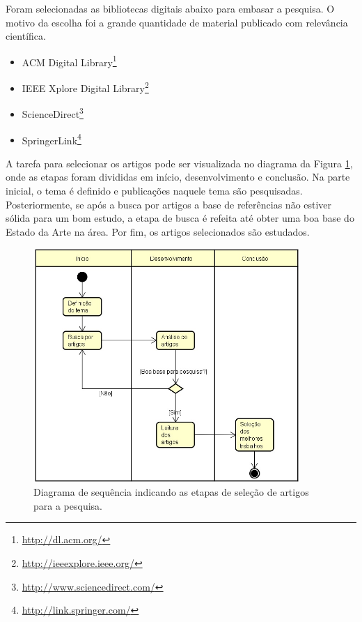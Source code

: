 \documentclass[smallextended]{svjour3}
\begin{document}
Foram selecionadas as bibliotecas digitais abaixo para embasar a pesquisa. O motivo da escolha foi a grande quantidade de material publicado com relevância científica.

\begin{itemize}
	\item \textsf{ACM Digital Library}\footnote{\url{http://dl.acm.org/}}
	
	\item \textsf{IEEE Xplore Digital Library}\footnote{\url{http://ieeexplore.ieee.org/}}
	
	\item \textsf{ScienceDirect}\footnote{\url{http://www.sciencedirect.com/}} 	
	
	\item \textsf{SpringerLink}\footnote{\url{http://link.springer.com/}}
\end{itemize}

A tarefa para selecionar os artigos pode ser visualizada no diagrama da Figura \ref{fig:diagrama}, onde as etapas foram divididas em início, desenvolvimento e conclusão. Na parte inicial, o tema é definido e publicações naquele tema são pesquisadas. Posteriormente, se após a busca por artigos a base de referências não estiver sólida para um bom estudo, a etapa de busca é refeita até obter uma boa base do Estado da Arte na área. Por fim, os artigos selecionados são estudados. 

\begin{figure}[!ht]
	\centering
	\includegraphics[width=0.9\textwidth]{imagens/diagrama.jpg}
	\caption{Diagrama de sequência indicando as etapas de seleção de artigos para a pesquisa.}
	\label{fig:diagrama}
\end{figure}
\end{document}
